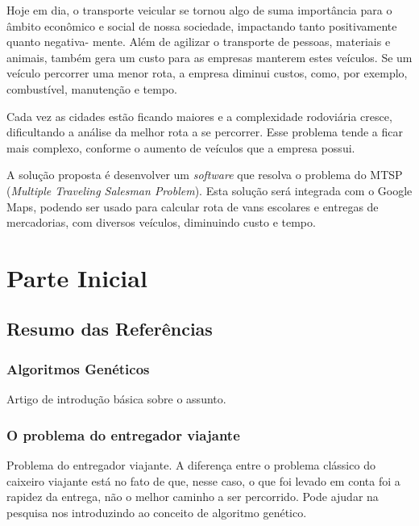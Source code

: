 \documentclass[12pt,openright,a4paper]{abntex2}
\begin{document}
\imprimircapa
\imprimirfolhaderosto

\tableofcontents

\newpage

\begin{resumo}
	Hoje em dia, o transporte veicular se tornou algo de suma importância para o âmbito
	econômico e social de nossa sociedade, impactando tanto positivamente quanto negativa-
	mente. 
	Além de agilizar o transporte de pessoas, materiais e animais, também gera um
	custo para as empresas manterem estes veículos. Se um veículo percorrer uma menor rota,
	a empresa diminui custos, como, por exemplo, combustível, manutenção e tempo. 

	Cada vez as cidades estão ficando maiores e a complexidade rodoviária cresce, dificultando a
	análise da melhor rota a se percorrer. Esse problema tende a ficar mais complexo, conforme o aumento de
	veículos que a empresa possui.
	
	A solução proposta é desenvolver um \textit{software} que resolva o problema do MTSP (\textit{Multiple Traveling Salesman Problem}).
	Esta solução será integrada com o Google Maps, podendo ser usado para calcular rota de vans escolares e entregas de mercadorias, com diversos veículos,
	diminuindo custo e tempo.
    \vspace{\onelineskip}
    \noindent
\end{resumo}

\textual

\part{Parte Inicial}

\chapter{Resumo das Referências}

\section{Algoritmos Genéticos}
Artigo de introdução básica sobre o assunto. \cite{0001-pdf}
\\

\section{O problema do entregador viajante}
Problema do entregador viajante. A diferença entre o problema clássico 
do caixeiro viajante está no fato de que, nesse caso, o que foi levado 
em conta foi a rapidez da entrega, não o melhor caminho a ser percorrido. 
Pode ajudar na pesquisa nos introduzindo ao conceito de algoritmo genético. \cite{0002-pdf}
\\
\end{document}
